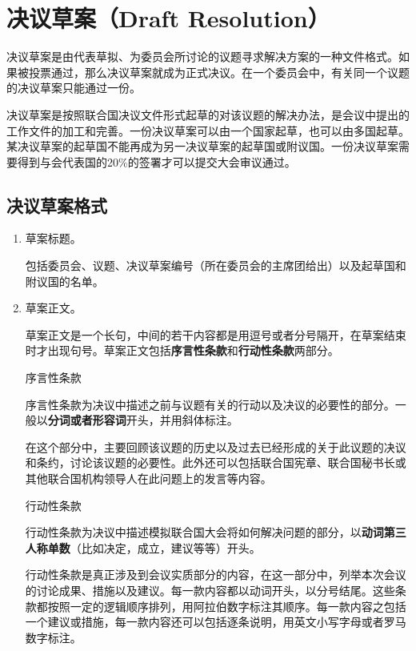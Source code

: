 \documentclass[a4paper,openany]{book}
\begin{document}
\section{决议草案（Draft Resolution）}

决议草案是由代表草拟、为委员会所讨论的议题寻求解决方案的一种文件格式。如果被投票通过，那么决议草案就成为正式决议。在一个委员会中，有关同一个议题的决议草案只能通过一份。

决议草案是按照联合国决议文件形式起草的对该议题的解决办法，是会议中提出的工作文件的加工和完善。一份决议草案可以由一个国家起草，也可以由多国起草。某决议草案的起草国不能再成为另一决议草案的起草国或附议国。一份决议草案需要得到与会代表国的20\%的签署才可以提交大会审议通过。

\subsection{决议草案格式}

\begin{enumerate}

\item 草案标题。

包括委员会、议题、决议草案编号（所在委员会的主席团给出）以及起草国和附议国的名单。

\item 草案正文。

草案正文是一个长句，中间的若干内容都是用逗号或者分号隔开，在草案结束时才出现句号。草案正文包括\textbf{序言性条款}和\textbf{行动性条款}两部分。

\iitem 序言性条款

序言性条款为决议中描述之前与议题有关的行动以及决议的必要性的部分。一般以\textbf{分词或者形容词}开头，并用斜体标注。

在这个部分中，主要回顾该议题的历史以及过去已经形成的关于此议题的决议和条约，讨论该议题的必要性。此外还可以包括联合国宪章、联合国秘书长或其他联合国机构领导人在此问题上的发言等内容。

\iitem 行动性条款

行动性条款为决议中描述模拟联合国大会将如何解决问题的部分，以\textbf{动词第三人称单数}（比如决定，成立，建议等等）开头。

行动性条款是真正涉及到会议实质部分的内容，在这一部分中，列举本次会议的讨论成果、措施以及建议。每一款内容都以动词开头，以分号结尾。这些条款都按照一定的逻辑顺序排列，用阿拉伯数字标注其顺序。每一款内容之包括一个建议或措施，每一款内容还可以包括逐条说明，用英文小写字母或者罗马数字标注。

\end{enumerate}
\end{document}
